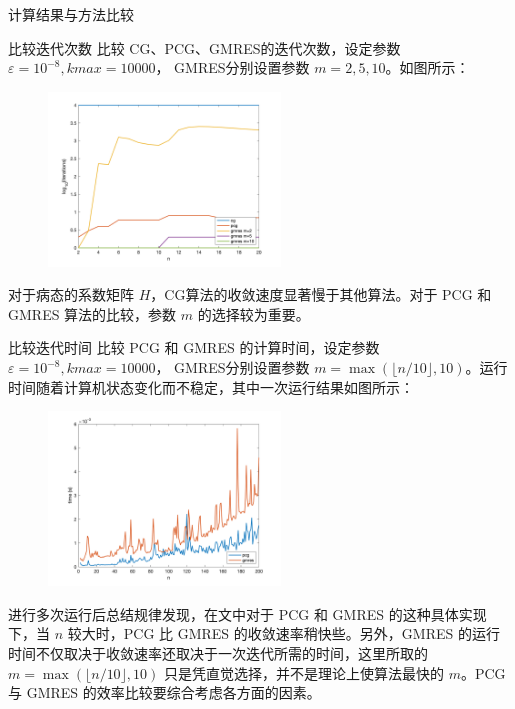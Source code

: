 \documentclass[a4paper]{article}
\begin{document}
\begin{multicols}{2}
\begin{section}{计算结果与方法比较}
	\begin{subsection}{比较迭代次数}
		比较 CG、PCG、GMRES的迭代次数，设定参数 $\varepsilon = 10^{-8}, kmax=10000$， GMRES分别设置参数 $m=2,5,10$。如图所示：
		
		\begin{figure}[H]
			\centering
			\includegraphics[width = 0.55\textwidth]{img/iterations.png} 
			\label{iter} 
		\end{figure}
		
		对于病态的系数矩阵 $H$，CG算法的收敛速度显著慢于其他算法。对于 PCG 和 GMRES 算法的比较，参数 $m$ 的选择较为重要。
	\end{subsection}
	
	\begin{subsection}{比较迭代时间}
		比较 PCG 和 GMRES 的计算时间，设定参数 $\varepsilon = 10^{-8}, kmax=10000$， GMRES分别设置参数 $m=\max(\lfloor n/10 \rfloor, 10)$。运行时间随着计算机状态变化而不稳定，其中一次运行结果如图所示：
		
		\begin{figure}[H]
			\centering
			\includegraphics[width = 0.55\textwidth]{img/time.png} 
			\label{time} 
		\end{figure}
		
		进行多次运行后总结规律发现，在文中对于 PCG 和 GMRES 的这种具体实现下，当 $n$ 较大时，PCG 比 GMRES 的收敛速率稍快些。另外，GMRES 的运行时间不仅取决于收敛速率还取决于一次迭代所需的时间，这里所取的 $m=\max(\lfloor n/10 \rfloor, 10)$ 只是凭直觉选择，并不是理论上使算法最快的 $m$。PCG 与 GMRES 的效率比较要综合考虑各方面的因素。
	\end{subsection}


\end{section}
\end{multicols}
\end{document}
